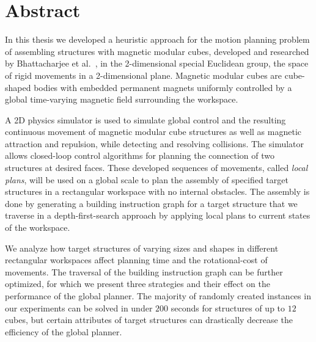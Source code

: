 \chapter*{Abstract}

In this thesis we developed a heuristic approach for the motion planning problem of assembling structures with magnetic modular cubes, developed and researched by Bhattacharjee et al.\ \cite{Bhattacharjee2022}, in the 2-dimensional special Euclidean group, the space of rigid movements in a 2-dimensional plane.
Magnetic modular cubes are cube-shaped bodies with embedded permanent magnets uniformly controlled by a global time-varying magnetic field surrounding the workspace.

A 2D physics simulator is used to simulate global control and the resulting continuous movement of magnetic modular cube structures as well as magnetic attraction and repulsion, while detecting and resolving collisions.
The simulator allows closed-loop control algorithms for planning the connection of two structures at desired faces.
These developed sequences of movements, called \textit{local plans}, will be used on a global scale to plan the assembly of specified target structures in a rectangular workspace with no internal obstacles.
The assembly is done by generating a building instruction graph for a target structure that we traverse in a depth-first-search approach by applying local plans to current states of the workspace.

We analyze how target structures of varying sizes and shapes in different rectangular workspaces affect planning time and the rotational-cost of movements.
The traversal of the building instruction graph can be further optimized, for which we present three strategies and their effect on the performance of the global planner.
The majority of randomly created instances in our experiments can be solved in under $200$ seconds for structures of up to $12$ cubes, but certain attributes of target structures can drastically decrease the efficiency of the global planner.